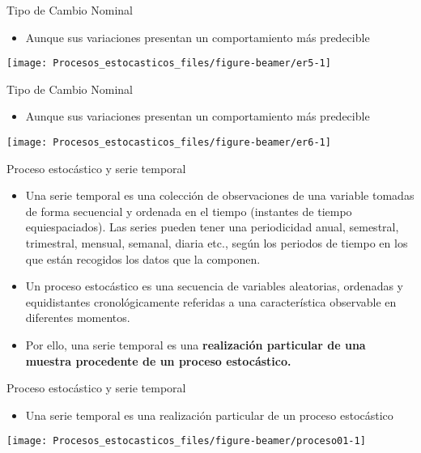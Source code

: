 \documentclass[ignorenonframetext,]{beamer}
\providecommand{\tightlist}{%
  \setlength{\itemsep}{0pt}\setlength{\parskip}{0pt}}
\begin{document}
\begin{frame}{Tipo de Cambio Nominal}

\begin{itemize}
\tightlist
\item
  Aunque sus variaciones presentan un comportamiento más predecible
\end{itemize}

\begin{center}\texttt{[image: Procesos\_estocasticos\_files/figure-beamer/er5-1]} \end{center}

\end{frame}

\begin{frame}{Tipo de Cambio Nominal}

\begin{itemize}
\tightlist
\item
  Aunque sus variaciones presentan un comportamiento más predecible
\end{itemize}

\begin{center}\texttt{[image: Procesos\_estocasticos\_files/figure-beamer/er6-1]} \end{center}

\end{frame}

\begin{frame}{Proceso estocástico y serie temporal}

\begin{itemize}
\item
  Una serie temporal es una colección de observaciones de una variable
  tomadas de forma secuencial y ordenada en el tiempo (instantes de
  tiempo equiespaciados). Las series pueden tener una periodicidad
  anual, semestral, trimestral, mensual, semanal, diaria etc., según los
  periodos de tiempo en los que están recogidos los datos que la
  componen.
\item
  Un proceso estocástico es una secuencia de variables aleatorias,
  ordenadas y equidistantes cronológicamente referidas a una
  característica observable en diferentes momentos.
\item
  Por ello, una serie temporal es una \textbf{realización particular de
  una muestra procedente de un proceso estocástico.}
\end{itemize}

\end{frame}

\begin{frame}{Proceso estocástico y serie temporal}

\begin{itemize}
\tightlist
\item
  Una serie temporal es una realización particular de un proceso
  estocástico
\end{itemize}

\begin{center}\texttt{[image: Procesos\_estocasticos\_files/figure-beamer/proceso01-1]} \end{center}

\end{frame}
\end{document}
